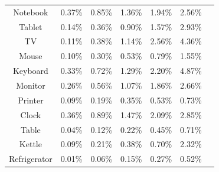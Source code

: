 \documentclass[msom,non-blindrev]{informs3} %
\theoremstyle{definition}
\begin{document}
\begin{table}[t]
{\begin{tabular}{|c|c|c|c|c|c|c|}
Notebook   & 0.37\% & 0.85\% & 1.36\% & 1.94\% & 2.56\% \\
Tablet   & 0.14\% & 0.36\% & 0.90\% & 1.57\% & 2.93\% \\
TV   & 0.11\% & 0.38\% & 1.14\% & 2.56\% & 4.36\% \\
Mouse   & 0.10\%  & 0.30\%  & 0.53\% & 0.79\% & 1.55\% \\
Keyboard   & 0.33\% & 0.72\% & 1.29\% & 2.20\%  & 4.87\% \\
Monitor   & 0.26\% & 0.56\% & 1.07\% & 1.86\% & 2.66\% \\
Printer   & 0.09\% & 0.19\% & 0.35\% & 0.53\% & 0.73\% \\
Clock   & 0.36\% & 0.89\% & 1.47\% & 2.09\% & 2.85\% \\
Table   & 0.04\% & 0.12\% & 0.22\% & 0.45\% & 0.71\% \\
Kettle   & 0.09\% & 0.21\% & 0.38\% & 0.70\%  & 2.32\% \\
Refrigerator   & 0.01\% & 0.06\% & 0.15\% & 0.27\% & 0.52\% \\
\hline
\end{tabular}
}


\end{table}
\end{document}
